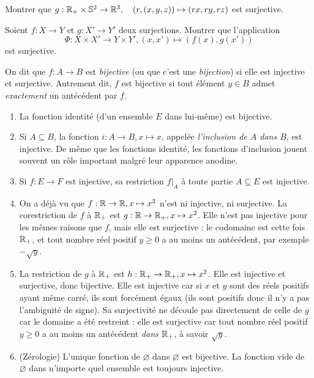 \begin{exercice}\label{exo-decomp-spherique}
Montrer que $g : \mathbb{R}_+\times \mathbb{S}^2 \to \mathbb{R}^3, \quad (r,(x,y,z))\mapsto (rx,ry,rz)$ est surjective.
\end{exercice}

\begin{exercice}\label{exo-produit-surjections}
Soient $f:X\to Y$ et $g:X'\to Y'$ deux surjections. Montrer que l'application
\[ 
\Phi : X\times X' \to Y\times Y', (x,x') \mapsto (f(x),g(x'))
\]
est surjective.
\end{exercice}




\begin{definition}
On dit que $f : A\to B$ est \emph{bijective} (ou que c'est une \emph{bijection}) si elle est injective et surjective. Autrement dit, $f$ est bijective si tout élément $y\in B$ admet \emph{exactement} un antécédent par $f$.
\end{definition}

\begin{exemple}
\begin{enumerate}
\item La fonction identité (d'un ensemble $E$ dans lui-même) est bijective.
\item Si $A\subseteq B$, la fonction $i : A\to B, x\mapsto x$, appelée \emph{l'inclusion de $A$ dans $B$}, est injective. De même que les fonctions identité, les fonctions d'inclusion jouent souvent un rôle important malgré leur apparence anodine.
\item Si $f : E\to F$ est injective, sa restriction $f|_A$ à toute partie $A\subseteq E$ est injective.
\item On a déjà vu que $f : \mathbb{R} \to \mathbb{R}, x\mapsto x^2$ n'est ni injective, ni surjective. La corestriction de $f$ à $\mathbb{R}_+$ est $g : \mathbb{R} \to \mathbb{R}_+, x\mapsto x^2$. Elle n'est pas injective pour les mêmes raisons que $f$, mais elle est surjective : le codomaine est cette fois $\mathbb{R}_+$, et tout nombre réel positif $y\geq 0$ a au moins un antécédent, par exemple $-\sqrt{y}$.
\item La restriction de $g$ à $\mathbb{R}_+$ est $h : \mathbb{R}_+ \to \mathbb{R}_+, x\mapsto x^2$. Elle est injective et surjective, donc bijective. Elle est injective car si $x$ et $y$ sont des réels positifs ayant même carré, ils sont forcément égaux (ils sont positifs donc il n'y a pas l'ambiguité de signe). Sa surjectivité ne découle pas directement de celle de $g$ car le domaine a été restreint : elle est surjective car tout nombre réel positif $y\geq 0$ a au moins un antécédent \emph{dans $\mathbb{R}_+$}, à savoir $\sqrt{y}$.
\item (Zérologie) L'unique fonction de $\varnothing$ dans $\varnothing$ est bijective. La fonction vide de $\varnothing$ dans n'importe quel ensemble est toujours injective.
\end{enumerate}
\end{exemple}

